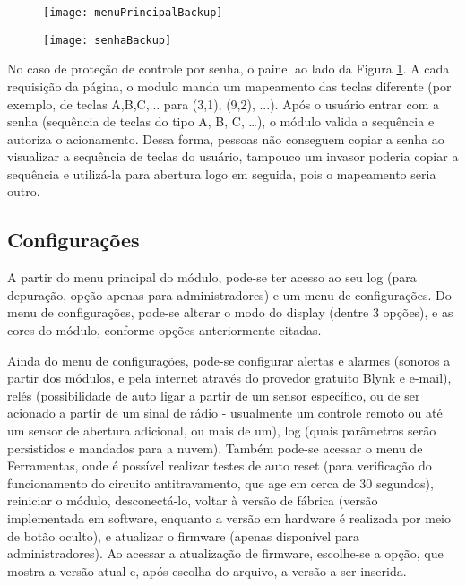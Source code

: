 \begin{figure}[hbp]
    \centering
    \begin{minipage}{.4\linewidth}
        \centering
        \texttt{[image: menuPrincipalBackup]}
        \label{fig:menuPrincipalBackup}
    \end{minipage}
    \hfill
    \begin{minipage}{.4\linewidth}
        \centering
        \texttt{[image: senhaBackup]}
        \label{fig:senhaBackup}
    \end{minipage}
\end{figure}

No caso de proteção de controle por senha, o painel ao lado da Figura \ref{fig:senhaBackup}. A cada requisição da página, o modulo manda um mapeamento das teclas diferente (por exemplo, de teclas A,B,C,... para (3,1), (9,2), ...). Após o usuário entrar com a senha (sequência de teclas do tipo A, B, C, …), o módulo valida a sequência e autoriza o acionamento. Dessa forma, pessoas não conseguem copiar a senha ao visualizar a sequência de teclas do usuário, tampouco um invasor poderia copiar a sequência e utilizá-la para abertura logo em seguida, pois o mapeamento seria outro.

\subsection{Configurações}

A partir do menu principal do módulo, pode-se ter acesso ao seu log (para depuração, opção apenas para administradores) e um menu de configurações. Do menu de configurações, pode-se alterar o modo do display (dentre 3 opções), e as cores do módulo, conforme opções anteriormente citadas.

Ainda do menu de configurações, pode-se configurar alertas e alarmes (sonoros a partir dos módulos, e pela internet através do provedor gratuito Blynk e e-mail), relés (possibilidade de auto ligar a partir de um sensor específico, ou de ser acionado a partir de um sinal de rádio - usualmente um controle remoto ou até um sensor de abertura adicional, ou mais de um), log (quais parâmetros serão persistidos e mandados para a nuvem). Também pode-se acessar o menu de Ferramentas, onde é possível realizar testes de auto reset (para verificação do funcionamento do circuito antitravamento, que age em cerca de 30 segundos), reiniciar o módulo, desconectá-lo, voltar à versão de fábrica (versão implementada em software, enquanto a versão em hardware é realizada por meio de botão oculto), e atualizar o firmware (apenas disponível para administradores).
Ao acessar a atualização de firmware, escolhe-se a opção, que mostra a versão atual e, após escolha do arquivo, a versão a ser inserida.

